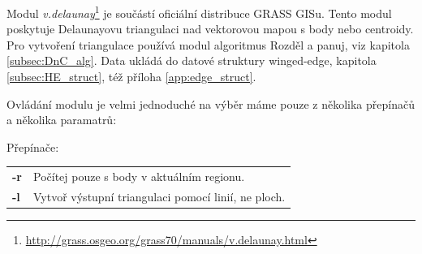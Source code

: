 \documentclass[12pt,a4paper]{article}
\begin{document}
Modul
\emph{v.delaunay}\footnote{\url{http://grass.osgeo.org/grass70/manuals/v.delaunay.html}}
je součástí oficiální distribuce GRASS GISu. Tento modul poskytuje
Delaunayovu triangulaci nad vektorovou mapou s body nebo
centroidy. Pro vytvoření triangulace používá modul algoritmus Rozděl a
panuj, viz kapitola \ref{subsec:DnC_alg}. Data ukládá do datové
struktury winged-edge, kapitola \ref{subsec:HE_struct}, též příloha \ref{app:edge_struct}.

\begin{figure}[h!]
\centering
\begin{floatrow}
\end{floatrow}
\end{figure}

Ovládání modulu je velmi jednoduché na výběr máme pouze z několika
přepínačů a několika paramatrů:

\noindent Přepínače:
\begin{tabular}{ll}
\textbf{-r}& Počítej pouze s body v aktuálním regionu.\\
\textbf{-l}& Vytvoř výstupní triangulaci pomocí linií, ne ploch.\\
\end{tabular}
\end{document}
